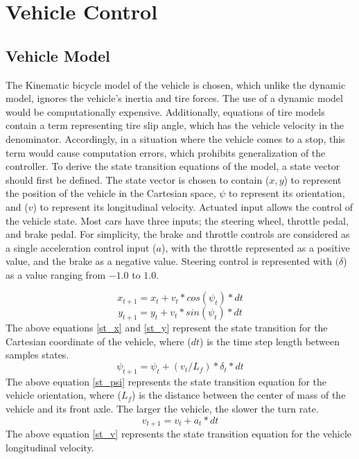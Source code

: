   \section{Vehicle Control}
      \subsection{Vehicle Model}
      The Kinematic bicycle model of the vehicle is chosen, which unlike the dynamic model, ignores the vehicle's inertia and tire forces. The use of a dynamic model would be computationally expensive. Additionally, equations of tire models contain a term representing tire slip angle, which has the vehicle velocity in the denominator. Accordingly, in a situation where the vehicle comes to a stop, this term would cause computation errors, which prohibits generalization of the controller.
To derive the state transition equations of the model, a state vector should first be defined. The state vector is chosen to contain (\(x, y\)) to represent the position of the vehicle in the Cartesian space, \(\psi\) to represent its orientation, and (\(v\)) to represent its longitudinal velocity.
Actuated input allows the control of the vehicle state. Most cars have three inputs; the steering wheel, throttle pedal, and brake pedal. For simplicity, the brake and throttle controls are considered as a single acceleration control input (\(a\)), with the throttle represented as a positive value, and the brake as a negative value. Steering control is represented with \((\delta\)) as a value ranging from \(-1.0\) to \(1.0\).

\begin{equation}
x_{t+1}=x_{t}+v_t*cos(\psi_t)*dt
\label{st_x}
\end{equation}
\begin{equation}
y_{t+1}=y_{t}+v_t*sin(\psi_t)*dt
\label{st_y}
\end{equation}
The above equations \eqref{st_x} and \eqref{st_y} represent the state transition for the Cartesian coordinate of the vehicle, where (\(dt\)) is the time step length between samples states.
\begin{equation}
\psi_{t+1}=\psi_{t}+(v_t/L_f)*\delta_t*dt
\label{st_psi}
\end{equation}
The above equation \eqref{st_psi} represents the state transition equation for the vehicle orientation, where (\(L_f\)) is the distance between the center of mass of the vehicle and its front axle. The larger the vehicle, the slower the turn rate.
\begin{equation}
v_{t+1}=v_{t}+a_t*dt
\label{st_v}
\end{equation}
The above equation \eqref{st_v} represents the state transition equation for the vehicle longitudinal velocity.


